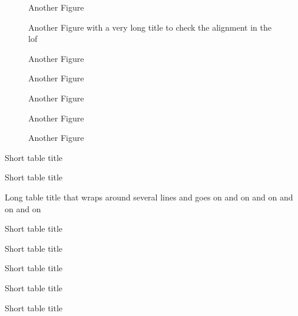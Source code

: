 \begin{figure}%
\caption{Another Figure}%
\end{figure}

\begin{figure}%
\caption{Another Figure with a very long title to check the alignment in the lof}%
\end{figure}

\begin{figure}%
\caption{Another Figure}%
\end{figure}

\begin{figure}%
\caption{Another Figure}%
\end{figure}

\begin{figure}%
\caption{Another Figure}%
\end{figure}

\begin{figure}%
\caption{Another Figure}%
\end{figure}

\begin{figure}%
\caption{Another Figure}%
\end{figure}

\begin{table}
\caption{Short table title}
\end{table}
\begin{table}
\caption{Short table title}
\end{table}
\begin{table}
\caption{Long table title that wraps around several lines and goes on and on and on and on and on}
\end{table}
\begin{table}
\caption{Short table title}
\end{table}
\begin{table}
\caption{Short table title}
\end{table}
\begin{table}
\caption{Short table title}
\end{table}
\begin{table}
\caption{Short table title}
\end{table}
\begin{table}
\caption{Short table title}
\end{table}
